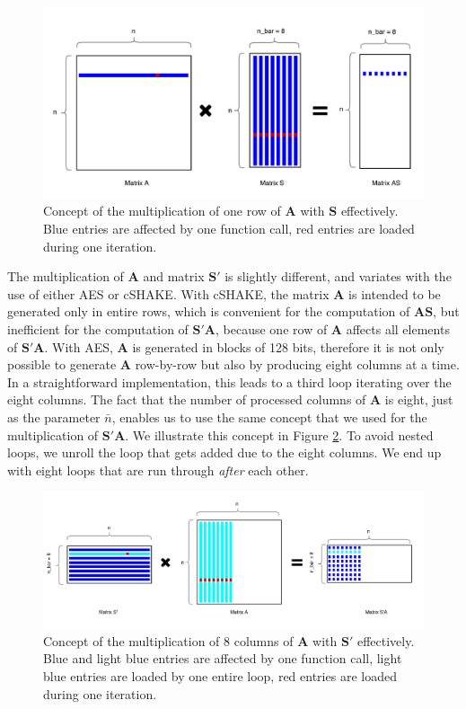   \begin{figure}[tbhp]
  	\centering
  	\includegraphics[width=1\textwidth,]{figures/mul.pdf}
  	\caption{Concept of the multiplication of one row of $\mathbf{A}$ with $\mathbf{S}$ effectively. Blue entries are affected by one function call, red entries are loaded during one iteration.}
  	\label{fig:mul}
  \end{figure}

The multiplication of $\mathbf{A}$ and matrix $\mathbf{S'}$ is slightly different, and variates with the use of either AES or cSHAKE. With cSHAKE, the matrix $\mathbf{A}$ is intended to be generated only in entire rows, which is convenient for the computation of $\mathbf{AS}$, but inefficient for the computation of $\mathbf{S'A}$, because one row of $\mathbf{A}$ affects all elements of $\mathbf{S'A}$. 
With AES, $\mathbf{A}$ is generated in blocks of 128 bits, therefore it is not only possible to generate $\mathbf{A}$ row-by-row but also by producing eight columns at a time. In a straightforward implementation, this leads to a third  loop iterating over the eight columns. The fact that the number of processed columns of $\mathbf{A}$ is eight, just as the parameter $\bar{n}$, enables us to use the same concept that we used for the multiplication of $\mathbf{S'A}$. We illustrate this concept in Figure \ref{fig:mulcol}. To avoid nested loops, we unroll the loop that gets added due to the eight columns. We end up with eight loops that are run through \emph{after} each other.
	
 \begin{figure}[tbhp]
   	\centering
   	\includegraphics[width=1\textwidth,]{figures/colmul.pdf}
   	\caption{Concept of the multiplication of 8 columns of $\mathbf{A}$ with $\mathbf{S'}$ effectively. Blue and light blue entries are affected by one function call, light blue entries are loaded by one entire loop, red entries are loaded during one iteration.}
   	\label{fig:mulcol}
 \end{figure}


